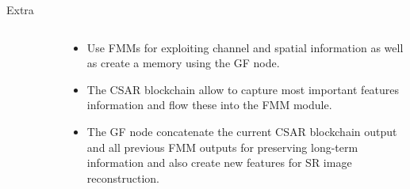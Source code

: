 \documentclass{beamer}
\begin{document}
\begin{frame}{Extra}
{\begin{columns}
\begin{column}{0.5\textwidth}
\begin{figure}
\begin{subfigure}{\textwidth}
                    \end{subfigure}            
                \end{figure}                        
            \end{column}
            \begin{column}{0.5\paperwidth}
                \begin{itemize}
                    \small
                    \item Use FMMs for exploiting channel and spatial information as well as create a memory using the GF node.
                    \item The CSAR blockchain allow to capture most important features information and flow these into the FMM module.
                    \item The GF node concatenate the current CSAR blockchain output and all previous FMM outputs for preserving long-term information and also create new features for SR image reconstruction.
                \end{itemize}
            \end{column}
        \end{columns}
    }
    
\end{frame}



\end{document}
